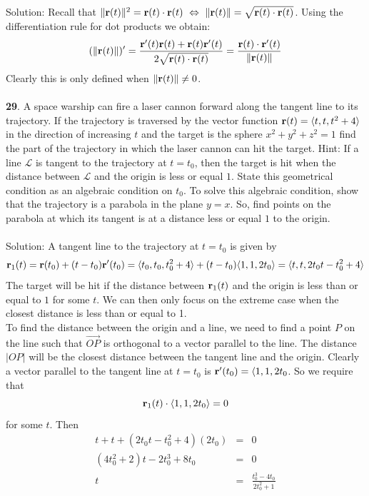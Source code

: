\documentclass[12pt]{amsbook}
\newcommand{\la}{\langle}
\newcommand{\ra}{\rangle}
\begin{document}
\\
\\
{\sc Solution}: Recall that $\|{\bf r}(t)\|^2={\bf r}(t)\cdot{\bf r}(t) \ \Leftrightarrow \ \|{\bf r}(t)\|=\sqrt{{\bf r}(t)\cdot{\bf r}(t)}$. Using the differentiation rule for dot products we obtain:
$$(\|{\bf r}(t)\|)'=\frac{{\bf r}'(t){\bf r}(t)+{\bf r}(t){\bf r}'(t)}{2\sqrt{{\bf r}(t)\cdot{\bf r}(t)}}=\frac{{\bf r}(t)\cdot{\bf r}'(t)}{\|{\bf r}(t)\|}$$
Clearly this is only defined when $\|{\bf r}(t)\| \neq 0$. 
\\
\\
{\small\bf 29}. A space warship can fire a laser cannon forward along the tangent
line to its trajectory. If the trajectory is traversed by the vector function
${\bf r}(t)=\la t,t,t^2+4\ra$ in the direction of increasing $t$ and the target is the sphere $x^2+y^2+z^2=1$ find the part of the trajectory in which the laser cannon can hit the target. Hint: If a line $\mathcal{L}$ is tangent to the trajectory at $t=t_0$, then the target is hit when the distance between $\mathcal{L}$ and the origin is less or
equal $1$. State this geometrical condition as an algebraic condition on $t_0$. To solve this algebraic condition, show that the trajectory is a parabola in the plane $y = x$. So, find points on the parabola at which its tangent is at
a distance less or equal $1$ to the origin.
\\
\\
{\sc Solution}: A tangent line to the trajectory at $t=t_0$ is given by
$${\bf r}_1(t)={\bf r}(t_0)+(t-t_0){\bf r}'(t_0)=\la t_0, t_0, t_0^2+4 \ra +(t-t_0)\la 1,1, 2t_0 \ra = \la t,t,2t_0t-t_0^2+4 \ra$$
The target will be hit if the distance between ${\bf r}_1(t)$ and the origin is less than or equal to $1$ for some $t$. We can then only focus on the extreme case when the closest distance is less than or equal to 1.
\\
 To find the distance between the origin and a line, we need to find a point $P$ on the line such that $\overrightarrow{OP}$ is orthogonal to a vector parallel to the line. The distance $|OP|$ will be the closest distance between the tangent line and the origin. Clearly a vector parallel to the tangent line at $t=t_0$ is ${\bf r}'(t_0)=\la 1,1,2t_0$. So we require that
 $${\bf r}_1(t)\cdot\la 1,1,2t_0 \ra=0$$
 for some $t$. Then
\begin{eqnarray*}
t+t+(2t_0t-t_0^2+4)(2t_0)&=&0\\
(4t_0^2+2)t-2t_0^3+8t_0&=&0\\
t&=&\frac{t_0^3-4t_0}{2t_0^2+1}
\end{eqnarray*}
\end{document}
